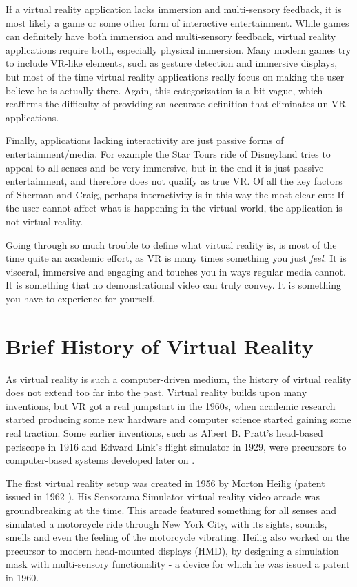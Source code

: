 \documentclass[12pt,a4paper,oneside,pdftex]{report}
\begin{document}
If a virtual reality application lacks immersion and multi-sensory feedback, it is most likely a game or some other form of interactive entertainment. While games can definitely have both immersion and multi-sensory feedback, virtual reality applications require both, especially physical immersion. Many modern games try to include VR-like elements, such as gesture detection and immersive displays, but most of the time virtual reality applications really focus on making the user believe he is actually there. Again, this categorization is a bit vague, which reaffirms the difficulty of providing an accurate definition that eliminates un-VR applications.

Finally, applications lacking interactivity are just passive forms of entertainment/media. For example the Star Tours ride of Disneyland \cite{StarToursDisney} tries to appeal to all senses and be very immersive, but in the end it is just passive entertainment, and therefore does not qualify as true VR. Of all the key factors of Sherman and Craig, perhaps interactivity is in this way the most clear cut: If the user cannot affect what is happening in the virtual world, the application is not virtual reality.

Going through so much trouble to define what virtual reality is, is most of the time quite an academic effort, as VR is many times something you just \emph{feel}. It is visceral, immersive and engaging and touches you in ways regular media cannot. It is something that no demonstrational video can truly convey. It is something you have to experience for yourself.

\section{Brief History of Virtual Reality}
\label{section:historyofvr}

As virtual reality is such a computer-driven medium, the history of virtual reality does not extend too far into the past. Virtual reality builds upon many inventions, but VR got a real jumpstart in the 1960s, when academic research started producing some new hardware and computer science started gaining some real traction. Some earlier inventions, such as Albert B. Pratt's head-based periscope in 1916 and Edward Link's flight simulator in 1929, were precursors to computer-based systems developed later on \cite{Sherman:2002:UVR:581839}.

The first virtual reality setup was created in 1956 by Morton Heilig \cite{Sherman:2002:UVR:581839} (patent issued in 1962 \cite{Burdea:2003:VRT:829566}). His Sensorama Simulator virtual reality video arcade was groundbreaking at the time. This arcade featured something for all senses and simulated a motorcycle ride through New York City, with its sights, sounds, smells and even the feeling of the motorcycle vibrating. Heilig also worked on the precursor to modern head-mounted displays (HMD), by designing a simulation mask with multi-sensory functionality - a device for which he was issued a patent in 1960.
\end{document}
